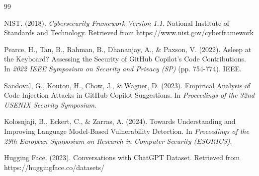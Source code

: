 \documentclass[12pt]{article}
\begin{document}
\begin{thebibliography}{99}
 
 NIST. (2018). \textit{Cybersecurity Framework Version 1.1}. National Institute of Standards and Technology. Retrieved from https://www.nist.gov/cyberframework
 
 Pearce, H., Tan, B., Rahman, B., Dhananjay, A., \& Paxson, V. (2022). Asleep at the Keyboard? Assessing the Security of GitHub Copilot's Code Contributions. In \textit{2022 IEEE Symposium on Security and Privacy (SP)} (pp. 754-774). IEEE.
 
 Sandoval, G., Kouton, H., Chow, J., \& Wagner, D. (2023). Empirical Analysis of Code Injection Attacks in GitHub Copilot Suggestions. In \textit{Proceedings of the 32nd USENIX Security Symposium}.
 
 Kolosnjaji, B., Eckert, C., \& Zarras, A. (2024). Towards Understanding and Improving Language Model-Based Vulnerability Detection. In \textit{Proceedings of the 29th European Symposium on Research in Computer Security (ESORICS)}.
 
 Hugging Face. (2023). Conversations with ChatGPT Dataset. Retrieved from https://huggingface.co/datasets/
 
\end{thebibliography}
 
\appendix
 
 
 
 
 
 
 
 
\end{document}
